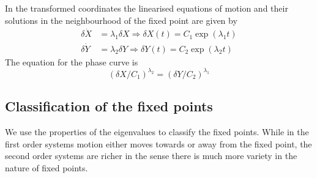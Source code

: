 In the transformed coordinates the linearised equations of motion and their solutions in the neighbourhood of the fixed point are given by
$$
\begin{aligned}
\delta \dot{X} &=\lambda_{1} \delta X \Rightarrow \delta X(t)=C_{1} \exp \left(\lambda_{1} t\right) \\
\delta \dot{Y} &=\lambda_{2} \delta Y \Rightarrow \delta Y(t)=C_{2} \exp \left(\lambda_{2} t\right)
\end{aligned}
$$
The equation for the phase curve is
$$
\left(\delta X / C_{1}\right)^{\lambda_{2}}=\left(\delta Y / C_{2}\right)^{\lambda_{1}}
$$
\subsection{ Classification of the fixed points}
We use the properties of the eigenvalues to classify the fixed points. While in the first order systems motion either moves towards or away from the fixed point, the second order systems are richer in the sense there is much more variety in the nature of fixed points.\\
